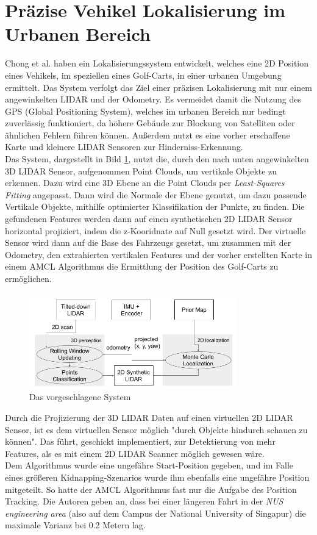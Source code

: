 \section{Präzise Vehikel Lokalisierung im Urbanen Bereich}\label{sec:vehicle_urban}
Chong et al. \cite{vehicleLocalizationUrban} haben ein Lokalisierungssystem entwickelt, welches eine 2D Position eines Vehikels, im speziellen eines Golf-Carts, in einer urbanen Umgebung ermittelt. Das System verfolgt das Ziel einer präzisen Lokalisierung mit nur einem angewinkelten LIDAR und der Odometry. Es vermeidet damit die Nutzung des GPS (Global Positioning System), welches im urbanen Bereich nur bedingt zuverlässig funktioniert, da höhere Gebäude zur Blockung von Satelliten oder ähnlichen Fehlern führen können. Außerdem nutzt es eine vorher erschaffene Karte und kleinere LIDAR Sensoren zur Hinderniss-Erkennung.\\
Das System, dargestellt in Bild \ref{fig:30_system}, nutzt die, durch den nach unten angewinkelten 3D LIDAR Sensor, aufgenommen Point Clouds, um vertikale Objekte zu erkennen. Dazu wird eine 3D Ebene an die Point Clouds per \textit{Least-Squares Fitting} angepasst. Dann wird die Normale der Ebene genutzt, um dazu passende Vertikale Objekte, mithilfe optimierter Klassifikation der Punkte, zu finden. Die gefundenen Features werden dann auf einen synthetischen 2D LIDAR Sensor horizontal projiziert, indem die z-Kooridnate auf Null gesetzt wird. Der virtuelle Sensor wird dann auf die Base des Fahrzeugs gesetzt, um zusammen mit der Odometry, den extrahierten vertikalen Features und der vorher erstellten Karte in einem AMCL Algorithmus die Ermittlung der Position des Golf-Carts zu ermöglichen.
\begin{figure}[!h]
    \centering
    \includegraphics[width=0.8\textwidth]{pic/loesungen/30_System.png}
    \caption{Das vorgeschlagene System \cite{vehicleLocalizationUrban}}
    \label{fig:30_system}
\end{figure}
Durch die Projizierung der 3D LIDAR Daten auf einen virtuellen 2D LIDAR Sensor, ist es dem virtuellen Sensor möglich "durch Objekte hindurch schauen zu können". Das führt, geschickt implementiert, zur Detektierung von mehr Features, als es mit einem 2D LIDAR Scanner möglich gewesen wäre.\\
Dem Algorithmus wurde eine ungefähre Start-Position gegeben, und im Falle eines größeren Kidnapping-Szenarios wurde ihm ebenfalls eine ungefähre Position mitgeteilt. So hatte der AMCL Algorithmus fast nur die Aufgabe des Position Tracking. Die Autoren geben an, dass bei einer längeren Fahrt in der \textit{NUS engineering area} (also auf dem Campus der National University of Singapur) die maximale Varianz bei 0.2 Metern lag.
